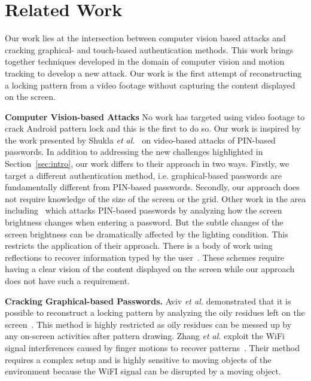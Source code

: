 \section{Related Work}
\label{section: relate-work}
Our work lies at the intersection between computer vision based attacks and
cracking graphical- and touch-based authentication methods. This work brings
together techniques developed in the domain of computer vision and motion
tracking to develop a new attack. Our work is the first attempt
of reconstructing a locking pattern from a video footage without
capturing the content displayed on the screen.


\vspace{2mm}
\noindent \textbf{Computer Vision-based Attacks} No work has targeted using video
footage to crack Android pattern lock and this is the first to do so. Our work is inspired by the work
presented by Shukla \emph{et al.}~\cite{shukla2014beware} on video-based attacks of
PIN-based passwords. In addition to addressing the new challenges highlighted in Section~\ref{sec:intro}, our work differs to their approach in
two ways.
Firstly, we target a different authentication method, i.e. graphical-based passwords are fundamentally different from PIN-based passwords. %
Secondly, our approach does not require knowledge of the size of the screen or the grid.
Other work in the area including~\cite{yue2014blind} which attacks PIN-based passwords by analyzing how the screen brightness changes when entering a password.
But the subtle changes of the screen brightness can be dramatically affected by the lighting condition. This restricts the application of their approach.
There is a body of work using reflections to recover information typed by the user~\cite{kuhn2002compromising,xu2013seeing,raguram2011ispy,backes2009tempest}. These schemes require having a clear vision of the content displayed on the screen while our approach does not have such a requirement.

\vspace{2mm}
\noindent \textbf{Cracking Graphical-based Passwords.}
Aviv \emph{et al.} demonstrated that it is possible to reconstruct a locking pattern by analyzing the oily residues left on the screen~\cite{aviv2010smudge}.
 This method is highly restricted as oily residues can be messed up by any on-screen activities after pattern drawing.
Zhang \emph{et al.} exploit the WiFi signal interferences caused by finger motions to recover patterns~\cite{zhang2016privacy}. Their method requires a complex setup and is highly sensitive to moving objects of the environment
because the WiFI signal can be disrupted by a moving object.

